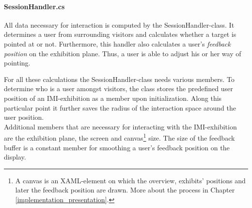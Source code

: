 
\paragraph{SessionHandler.cs} All data necessary for interaction is computed by the SessionHandler-class. It determines a user from surrounding visitors and calculates whether a target is pointed at or not. Furthermore, this handler also calculates a user's \textit{feedback position} on the exhibition plane. Thus, a user is able to adjust his or her way of pointing.

For all these calculations the SessionHandler-class needs various members. To determine who is a user amongst visitors, the class stores the predefined user position of an \ac{IMI}-exhibition as a member upon initialization. Along this particular point it further saves the radius of the interaction space around the user position.
\\
Additional members that are necessary for interacting with the \ac{IMI}-exhibition are the exhibition plane, the screen and canvas\footnote{A canvas is an XAML-element on which the overview, exhibits' positions and later the feedback position are drawn. More about the process in Chapter \ref{implementation_presentation}.} size. The size of the feedback buffer is a constant member for smoothing a user's feedback position on the display. 

